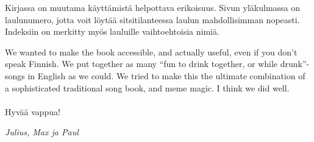 Kirjassa on muutama käyttämistä helpottava erikoisuus. Sivun yläkulmassa on laulunumero, jotta
voit löytää sitsitilanteessa laulun mahdollisimman nopeasti. Indeksiin on merkitty myös lau\-luil\-le vaihtoehtoisia nimiä.

We wanted to make the book accessible, and actually useful, even if you don’t
speak Finnish. We put together as many “fun to drink together, or while drunk”-songs
in English as we could. We tried to make this the ultimate combination of a
sophisticated traditional song book, and meme magic. I think we did well.
\\
\\
Hyvää vappua!

\vfill
\textit{Julius, Max ja Paul}

\newpage
\blankpage
